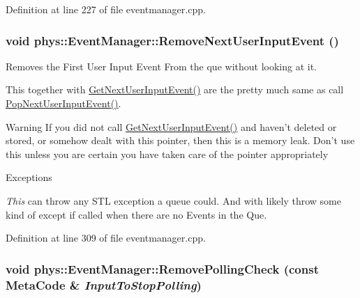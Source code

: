 Definition at line 227 of file eventmanager.cpp.

\hypertarget{classphys_1_1EventManager_add41b5f4d2942461bcaf40a97ad40b09}{
\subsubsection[{RemoveNextUserInputEvent}]{\setlength{\rightskip}{0pt plus 5cm}void phys::EventManager::RemoveNextUserInputEvent ()}}
\label{da/dde/classphys_1_1EventManager_add41b5f4d2942461bcaf40a97ad40b09}


Removes the First User Input Event From the que without looking at it. 

This together with \hyperlink{classphys_1_1EventManager_a38b42602a3a4d621048c78b525b4db49}{GetNextUserInputEvent()} are the pretty much same as call \hyperlink{classphys_1_1EventManager_afa89317d4b16c2b7065b9f79a4354654}{PopNextUserInputEvent()}. \begin{DoxyWarning}{Warning}
If you did not call \hyperlink{classphys_1_1EventManager_a38b42602a3a4d621048c78b525b4db49}{GetNextUserInputEvent()} and haven't deleted or stored, or somehow dealt with this pointer, then this is a memory leak. Don't use this unless you are certain you have taken care of the pointer appropriately 
\end{DoxyWarning}

\begin{DoxyExceptions}{Exceptions}
\item[{\em This}]can throw any STL exception a queue could. And with likely throw some kind of except if called when there are no Events in the Que. \end{DoxyExceptions}


Definition at line 309 of file eventmanager.cpp.

\hypertarget{classphys_1_1EventManager_adaf7d5346932506ed43f893eb071fd39}{
\subsubsection[{RemovePollingCheck}]{\setlength{\rightskip}{0pt plus 5cm}void phys::EventManager::RemovePollingCheck (const {\bf MetaCode} \& {\em InputToStopPolling})}}
\label{da/dde/classphys_1_1EventManager_adaf7d5346932506ed43f893eb071fd39}


